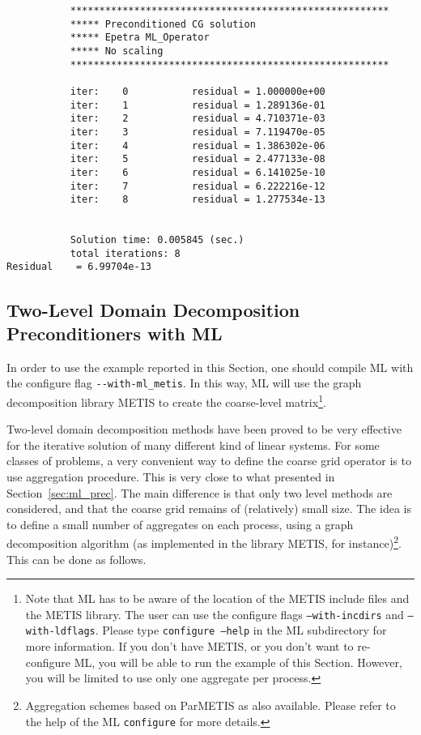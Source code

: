 \begin{verbatim}
           *******************************************************
           ***** Preconditioned CG solution
           ***** Epetra ML_Operator
           ***** No scaling
           *******************************************************

           iter:    0           residual = 1.000000e+00
           iter:    1           residual = 1.289136e-01
           iter:    2           residual = 4.710371e-03
           iter:    3           residual = 7.119470e-05
           iter:    4           residual = 1.386302e-06
           iter:    5           residual = 2.477133e-08
           iter:    6           residual = 6.141025e-10
           iter:    7           residual = 6.222216e-12
           iter:    8           residual = 1.277534e-13


           Solution time: 0.005845 (sec.)
           total iterations: 8
Residual    = 6.99704e-13
\end{verbatim}



\subsection{Two-Level Domain Decomposition Preconditioners with ML}
\label{sec:ml_DD}

In order to use the example reported in this Section, one should compile
ML with the configure flag \verb!--with-ml_metis!. In this way, ML will
use the graph decomposition library METIS to create the coarse-level
matrix\footnote{Note that ML has to be aware of the location of the
  METIS include files and the METIS library. The user can use the
  configure flags {\tt --with-incdirs} and {\tt --with-ldflags}.  Please
  type {\tt configure --help} in the ML subdirectory for more
  information. If you don't have METIS, or you don't want to
  re-configure ML, you will be able to run the example of this Section.
  However, you will be limited to use only one aggregate per process.}.

Two-level domain decomposition methods have been proved to be very
effective for the iterative solution of many different kind of linear
systems.  For some classes of problems, a very convenient way to define
the coarse grid operator is to use aggregation procedure. This is very
close to what presented in Section~\ref{sec:ml_prec}. The main
difference is that only two level methods are considered, and that the
coarse grid remains of (relatively) small size. The idea is to define a
small number of aggregates on each process, using a graph decomposition
algorithm (as implemented in the library METIS, for
instance)\footnote{Aggregation schemes based on ParMETIS as also
  available. Please refer to the help of the ML {\tt configure} for more
  details.}. This can be done as follows.

